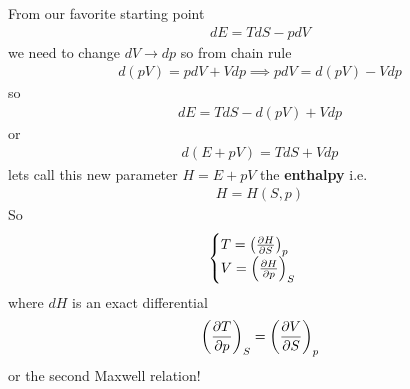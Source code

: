 \documentclass[../main.tex]{subfiles}
\begin{document}
From our favorite starting point
\begin{align*}
    dE = TdS - pdV 
\end{align*}
we need to change $dV \to dp$ so from chain rule
\begin{align*}
    d(pV) = p dV + V dp \implies pdV = d(pV) - V dp 
\end{align*}
so
\begin{align*}
    dE = TdS - d(pV) + V dp
\end{align*}
or
\begin{align*}
    d(E + pV) = TdS + Vdp
\end{align*}
lets call this new parameter $H = E + pV$ the \textbf{enthalpy} i.e.
\begin{align*}
    H = H(S,p)
\end{align*}
So
\begin{align*}
    \begin{cases}
        T = \qt(\pdv{H}{S})_p \\
        V = \qt(\pdv{H}{p})_S
    \end{cases}
\end{align*}
where $dH$ is an exact differential
\begin{align*}
    \qt(\pdv{T}{p})_S = \qt(\pdv{V}{S})_p
\end{align*}
or the second Maxwell relation!
\end{document}
